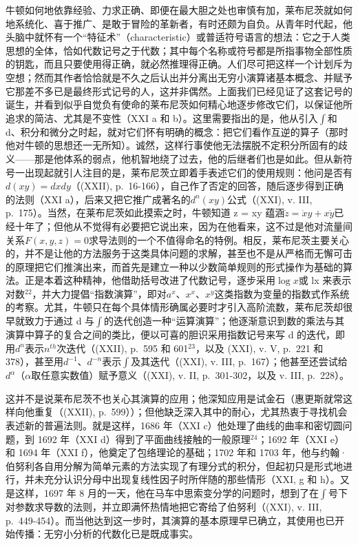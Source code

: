 牛顿如何地依靠经验、力求正确、即便在最大胆之处也审慎有加，莱布尼茨就如何地系统化、喜于推广、是敢于冒险的革新者，有时还颇为自负。从青年时代起，他头脑中就怀有一个“特征术”（characteristic）或普适符号语言的想法：它之于人类思想的全体，恰如代数记号之于代数；其中每个名称或符号都是所指事物全部性质的钥匙，而且只要使用得正确，就必然推理得正确。人们尽可把这样一个计划斥为空想；然而其作者恰恰就是不久之后认出并分离出无穷小演算诸基本概念、并赋予它那差不多已是最终形式记号的人，这并非偶然。上面我们已经见证了这套记号的诞生，并看到似乎自觉负有使命的莱布尼茨如何精心地逐步修改它们，以保证他所追求的简洁、尤其是不变性（XXI a 和 b）。这里需要指出的是，他从引入\(\int\)和 d、积分和微分之时起，就对它们怀有明确的概念：把它们看作互逆的算子（那时他对牛顿的思想还一无所知）。诚然，这样行事使他无法摆脱不定积分所固有的歧义——那是他体系的弱点，他机智地绕了过去，他的后继者们也是如此。但从新符号一出现起就引人注目的是，莱布尼茨立即着手表述它们的使用规则：他问是否有\(d(xy) = dx dy\)（(XXII), p.~16-166），自己作了否定的回答，随后逐步得到正确的法则（XXI a），后来又把它推广成著名的\(d^{n}(xy)\)公式（(XXI), v. III, p.~175）。当然，在莱布尼茨如此摸索之时，牛顿知道 z = xy 蕴涵\(\dot{z} = \dot{x}y + x\dot{y}\)已经十年了；但他从不觉得有必要把它说出来，因为在他看来，这不过是他对流量间关系\(F(x, y, z) = 0\)求导法则的一个不值得命名的特例。相反，莱布尼茨主要关心的，并不是让他的方法服务于这类具体问题的求解，甚至也不是从严格而无懈可击的原理把它们推演出来，而首先是建立一种以少数简单规则的形式操作为基础的算法。正是本着这种精神，他借助括号改进了代数记号，逐步采用\(\log x\)或 lx 来表示对数\({}^{22}\)，并大力提倡“指数演算”，即对\(a^{x}\)、\(x^{x}\)、\(x^{y}\)这类指数为变量的指数式作系统的考察。尤其，牛顿只在每个具体情形确属必要时才引入高阶流数，莱布尼茨却很早就致力于通过 d 与\(\int\)的迭代创造一种“运算演算”；他逐渐意识到数的乘法与其演算中算子的复合之间的类比，便以可喜的胆识采用指数记号来写 d 的迭代，即用\(d^{n}\)表示\(n^{th}\)次迭代（(XXII), p.~595 和 601\({}^{23}\)，以及 (XXI), v. V, p.~221 和 378），甚至用\(d^{-1}\)、\(d^{-n}\)表示\(\int\)及其迭代（(XXI), v. III, p.~167）；他甚至还尝试给\(d^{\alpha}\)（\(\alpha\)取任意实数值）赋予意义（(XXI), v. II, p.~301-302，以及 v. III, p.~228）。

这并不是说莱布尼茨不也关心其演算的应用；他深知应用是试金石（惠更斯就常这样向他重复（(XXII), p.~599））；但他缺乏深入其中的耐心，尤其热衷于寻找机会表述新的普遍法则。就是这样，1686 年（XXI c）他处理了曲线的曲率和密切圆问题，到 1692 年（XXI d）得到了平面曲线接触的一般原理\({}^{24}\)；1692 年（XXI e）和 1694 年（XXI f），他奠定了包络理论的基础；1702 年和 1703 年，他与约翰·伯努利各自用分解为简单元素的方法实现了有理分式的积分，但起初只是形式地进行，并未充分认识分母中出现复线性因子时所伴随的那些情形（XXI, g 和 h）。又是这样，1697 年 8 月的一天，他在马车中思索变分学的问题时，想到了在\(\int\)号下对参数求导数的法则，并立即满怀热情地把它寄给了伯努利（(XXI), v. III, p.~449-454）。而当他达到这一步时，其演算的基本原理早已确立，其使用也已开始传播：无穷小分析的代数化已是既成事实。

